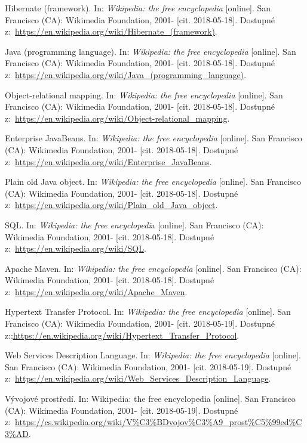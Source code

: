 \documentclass[a4paper,12pt]{article}
\begin{document}
{  Hibernate (framework). In: \textit{Wikipedia: the free encyclopedia} [online]. San Francisco (CA): Wikimedia Foundation, 2001- [cit. 2018-05-18]. Dostupné z:~\url{https://en.wikipedia.org/wiki/Hibernate_(framework)}.
  
  Java (programming language). In: \textit{Wikipedia: the free encyclopedia} [online]. San Francisco (CA): Wikimedia Foundation, 2001- [cit. 2018-05-18]. Dostupné z:~\url{https://en.wikipedia.org/wiki/Java_(programming_language)}.
  
  Object-relational mapping. In: \textit{Wikipedia: the free encyclopedia} [online]. San Francisco (CA): Wikimedia Foundation, 2001- [cit. 2018-05-18]. Dostupné z:~\url{https://en.wikipedia.org/wiki/Object-relational_mapping}.
  
  Enterprise JavaBeans. In: \textit{Wikipedia: the free encyclopedia} [online]. San Francisco (CA): Wikimedia Foundation, 2001- [cit. 2018-05-18]. Dostupné z:~\url{https://en.wikipedia.org/wiki/Enterprise_JavaBeans}.
  
  Plain old Java object. In: \textit{Wikipedia: the free encyclopedia} [online]. San Francisco (CA): Wikimedia Foundation, 2001- [cit. 2018-05-18]. Dostupné z:~\url{https://en.wikipedia.org/wiki/Plain_old_Java_object}.
  
  SQL. In: \textit{Wikipedia: the free encyclopedi}a [online]. San Francisco (CA): Wikimedia Foundation, 2001- [cit. 2018-05-18]. Dostupné z:~\url{https://en.wikipedia.org/wiki/SQL}.
  
  Apache Maven. In: \textit{Wikipedia: the free encyclopedia} [online]. San Francisco (CA): Wikimedia Foundation, 2001- [cit. 2018-05-18]. Dostupné z:~\url{https://en.wikipedia.org/wiki/Apache_Maven}.
  
  Hypertext Transfer Protocol. In: \textit{Wikipedia: the free encyclopedia} [online]. San Francisco (CA): Wikimedia Foundation, 2001- [cit. 2018-05-19]. Dostupné z:;\url{https://en.wikipedia.org/wiki/Hypertext_Transfer_Protocol}.
  
  Web Services Description Language. In: \textit{Wikipedia: the free encyclopedia} [online]. San Francisco (CA): Wikimedia Foundation, 2001- [cit. 2018-05-19]. Dostupné z:~\url{https://en.wikipedia.org/wiki/Web_Services_Description_Language}.
  
  Vývojové prostředí. In: Wikipedia: the free encyclopedia [online]. San Francisco (CA): Wikimedia Foundation, 2001- [cit. 2018-05-19]. Dostupné z:~\url{https://cs.wikipedia.org/wiki/V\%C3\%BDvojov\%C3\%A9_prost\%C5\%99ed\%C3\%AD}.
 
}
\end{document}
